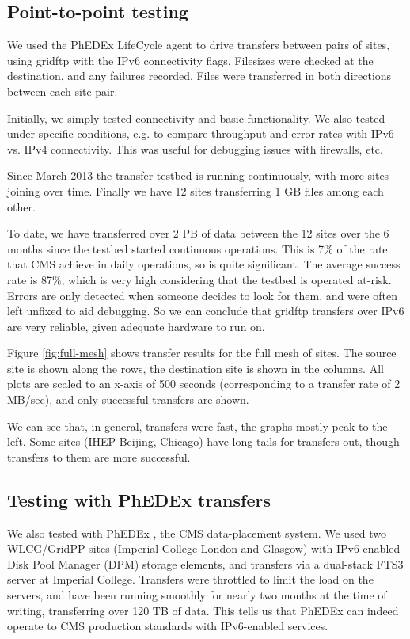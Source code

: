 \subsection{Point-to-point testing}

We used the PhEDEx LifeCycle agent \cite{LifeCycle} to drive transfers between pairs of sites, using gridftp with the IPv6 connectivity flags. Filesizes were checked at the destination, and any failures recorded. Files were transferred in both directions between each site pair.

Initially, we simply tested connectivity and basic functionality. We also tested under specific conditions, e.g. to compare throughput and error rates with IPv6 vs. IPv4 connectivity. This was useful for debugging issues with firewalls, etc.

Since March 2013 the transfer testbed is running continuously, with more sites joining over time. Finally we have 12 sites transferring 1 GB files among each other.

To date, we have transferred over 2 PB of data between the 12 sites over the 6 months since the testbed started continuous operations. This is 7\% of the rate that CMS \cite{cms} achieve in daily operations, so is quite significant. The average success rate is 87\%, which is very high considering that the testbed is operated at-risk. Errors are only detected when someone decides to look for them, and were often left unfixed to aid debugging.
So we can conclude that gridftp transfers over IPv6 are very reliable, given adequate hardware to run on.

Figure \ref{fig:full-mesh} shows transfer results for the full mesh of sites. The source site is shown along the rows, the destination site is shown in the columns. All plots are scaled to an x-axis of 500 seconds (corresponding to a transfer rate of 2 MB/sec), and only successful transfers are shown.

We can see that, in general, transfers were fast, the graphs mostly peak to the left. Some sites (IHEP Beijing, Chicago) have long tails for transfers out, though transfers to them are more successful.

\subsection{Testing with PhEDEx transfers}
We also tested with PhEDEx \cite{PhEDEx}, the CMS data-placement system. We used two WLCG/GridPP sites (Imperial College London and Glasgow) with IPv6-enabled Disk Pool Manager (DPM) storage elements, and transfers via a dual-stack FTS3 \cite{FTS3} server at Imperial College. Transfers were throttled to limit the load on the servers, and have been running smoothly for nearly two months at the time of writing, transferring over 120 TB of data. This tells us that PhEDEx can indeed operate to CMS production standards with IPv6-enabled services.

